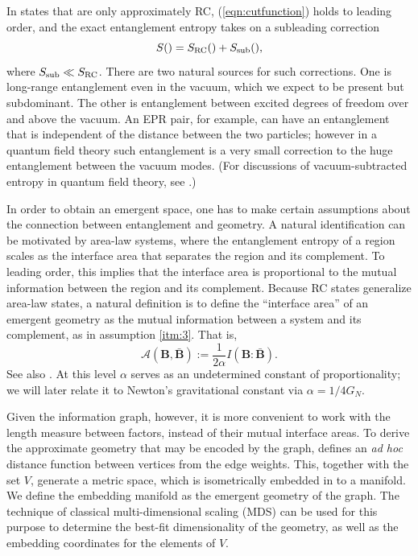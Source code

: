 \documentclass[%
12pt,preprint,
nofootinbib,
amsmath,amssymb,
aps,
prd,
showpacs,
superscriptaddress
]{revtex4-2}
\newcommand{\area}{\mathcal{A}}
\DeclareMathOperator{\co}{:}
\begin{document}
In states that are only approximately RC, (\ref{eqn:cutfunction}) holds to leading order, and the exact entanglement entropy takes on a subleading correction
\begin{equation}
 S(\textbf{B})=S_{\rm RC}(\textbf{B})+ S_{\rm sub}(\textbf{B}),
\end{equation}
where $S_{\rm sub}\ll S_{\rm RC}$. 
There are two natural sources for such corrections.
One is long-range entanglement even in the vacuum, which we expect to be present but subdominant.
The other is entanglement between excited degrees of freedom over and above the vacuum.
An EPR pair, for example, can have an entanglement that is independent of the distance between the two particles; however in a quantum field theory such entanglement is a very small correction to the huge entanglement between the vacuum modes.
(For discussions of vacuum-subtracted entropy in quantum field theory, see \cite{Casini:2008cr,Bousso:2014sda,Bousso:2014uxa}.)

In order to obtain an emergent space, one has to make certain assumptions about the connection between entanglement and geometry. A natural identification can be motivated by area-law systems, where the entanglement entropy of a region scales as the interface area that separates the region and its complement. To leading order, this implies that the interface area is proportional to the mutual information between the region and its complement. Because RC states generalize area-law states, a natural definition is to define the ``interface area'' of an emergent geometry as the mutual information between a system and its complement, as in assumption \ref{itm:3}.
That is,
\begin{equation}
 \area(\textbf{B}, \bar{\textbf{B}}):=\frac{1}{2\alpha} I(\textbf{B}\co \bar{\textbf{B}}).
\end{equation}
See also \cite{Bianchi:2012ev,Myers:2013lva}.
At this level $\alpha$ serves as an undetermined constant of proportionality; we will later relate it to Newton's gravitational constant via $\alpha = 1/4G_N$.

Given the information graph, however, it is more convenient to work with the length measure between factors, instead of their mutual interface areas.
To derive the approximate geometry that may be encoded by the graph, \cite{Cao:2016mst} defines an \textit{ad hoc} distance function between vertices from the edge weights. This, together with the set $V$, generate a metric space, which is isometrically embedded in to a manifold. We define the embedding manifold as the emergent geometry of the graph. The technique of classical multi-dimensional scaling (MDS) \cite{cmds,walter,eladkimmel,gmds,mdsbook} can be used for this purpose to determine the best-fit dimensionality of the geometry, as well as the embedding coordinates for the elements of $V$.
\end{document}
